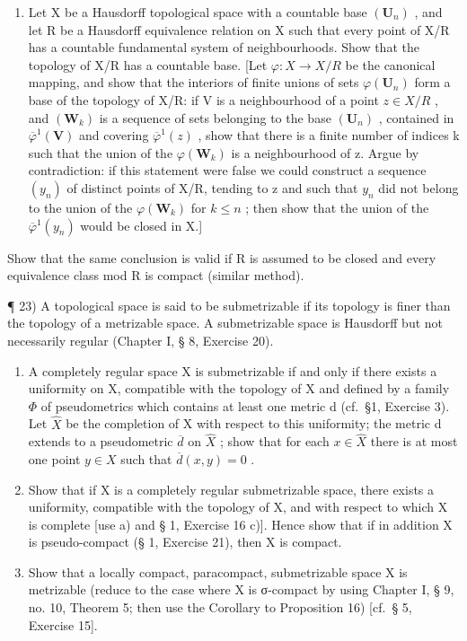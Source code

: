 \begin{enumerate}
\def\labelenumi{\arabic{enumi})}
\setcounter{enumi}{21}
\tightlist
\item
  Let X be a Hausdorff topological space with a countable base \((\mathbf{U}_{n})\) , and let R be a Hausdorff equivalence relation on X such that every point of X/R has a countable fundamental system of neighbourhoods. Show that the topology of X/R has a countable base. {[}Let \(\varphi: X \to X/R\) be the canonical mapping, and show that the interiors of finite unions of sets \(\varphi(\mathbf{U}_{n})\) form a base of the topology of X/R: if V is a neighbourhood of a point \(z \in X/R\) , and \((\mathbf{W}_{k})\) is a sequence of sets belonging to the base \((\mathbf{U}_{n})\) , contained in \(\overline{\varphi}^{1}(\mathbf{V})\) and covering \(\overline{\varphi}^{1}(z)\) , show that there is a finite number of indices k such that the union of the \(\varphi(\mathbf{W}_{k})\) is a neighbourhood of z. Argue by contradiction: if this statement were false we could construct a sequence \((y_{n})\) of distinct points of X/R, tending to z and such that \(y_{n}\) did not belong to the union of the \(\varphi(\mathbf{W}_{k})\) for \(k \leqslant n\) ; then show that the union of the \(\overline{\varphi}^{1}(y_{n})\) would be closed in X.{]}
\end{enumerate}

Show that the same conclusion is valid if R is assumed to be closed and every equivalence class mod R is compact (similar method).

¶ 23) A topological space is said to be submetrizable if its topology is finer than the topology of a metrizable space. A submetrizable space is Hausdorff but not necessarily regular (Chapter I, § 8, Exercise 20).

\begin{enumerate}
\def\labelenumi{\alph{enumi})}
\item
  A completely regular space X is submetrizable if and only if there exists a uniformity on X, compatible with the topology of X and defined by a family \(\Phi\) of pseudometrics which contains at least one metric d (cf.~§1, Exercise 3). Let \(\hat{X}\) be the completion of X with respect to this uniformity; the metric d extends to a pseudometric \(\overline{d}\) on \(\hat{X}\) ; show that for each \(x \in \hat{X}\) there is at most one point \(y \in X\) such that \(\overline{d}(x, y) = 0\) .
\item
  Show that if X is a completely regular submetrizable space, there exists a uniformity, compatible with the topology of X, and with respect to which X is complete {[}use a) and § 1, Exercise 16 c){]}. Hence show that if in addition X is pseudo-compact (§ 1, Exercise 21), then X is compact.
\item
  Show that a locally compact, paracompact, submetrizable space X is metrizable (reduce to the case where X is σ-compact by using Chapter I, § 9, no. 10, Theorem 5; then use the Corollary to Proposition 16) {[}cf.~§ 5, Exercise 15{]}.
\end{enumerate}

